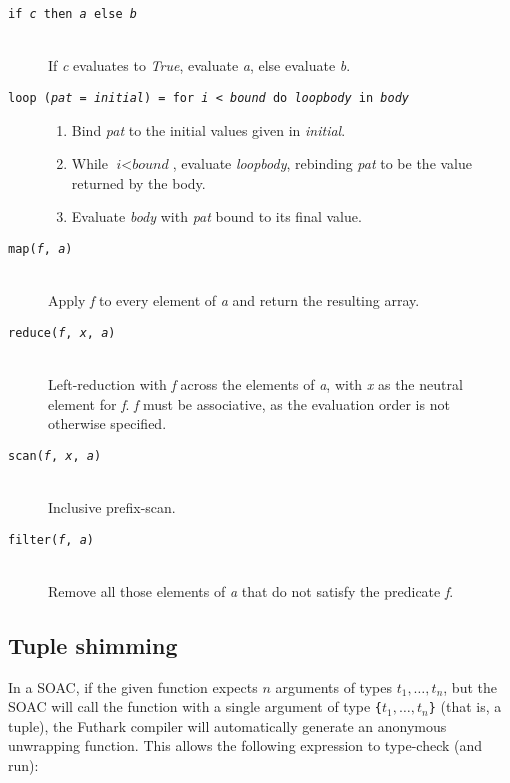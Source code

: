 \documentclass[oneside]{memoir}
\begin{document}
\begin{description}
  \item[\texttt{if \textit{c} then \textit{a} else \textit{b}}]\hfill\\
    If \textit{c} evaluates to \textit{True}, evaluate \textit{a},
    else evaluate \textit{b}.

  \item[\texttt{loop (\textit{pat} = \textit{initial}) = for \textit{i} < \textit{bound} do \textit{loopbody} in \textit{body}}]\hfill
    \begin{enumerate}
    \item Bind \textit{pat} to the initial values given in \textit{initial}.
    \item While $\textit{i} < \textit{bound}$, evaluate \textit{loopbody},
      rebinding \textit{pat} to be the value returned by the body.
    \item Evaluate \textit{body} with \textit{pat} bound to its final
      value.
    \end{enumerate}

  \item[\texttt{map(\textit{f}, \textit{a})}]\hfill\\
    Apply \textit{f} to every element of \textit{a} and return the resulting array.

  \item[\texttt{reduce(\textit{f}, \textit{x}, \textit{a})}]\hfill\\
    Left-reduction with \textit{f} across the elements of \textit{a},
    with \textit{x} as the neutral element for \textit{f}.  \textit{f}
    must be associative, as the evaluation order is not otherwise
    specified.

  \item[\texttt{scan(\textit{f}, \textit{x}, \textit{a})}]\hfill\\
    Inclusive prefix-scan.

  \item[\texttt{filter(\textit{f}, \textit{a})}]\hfill\\
    Remove all those elements of \textit{a} that do not satisfy the
    predicate \textit{f}.

\end{description}

\subsection{Tuple shimming}

In a SOAC, if the given function expects $n$ arguments of types
$t_{1}, \ldots, t_{n}$, but the SOAC will call the function with a
single argument of type \texttt{\{$t_{1}, \ldots, t_{n}$\}} (that is,
a tuple), the Futhark compiler will automatically generate an anonymous
unwrapping function.  This allows the following expression to
type-check (and run):
\end{document}
